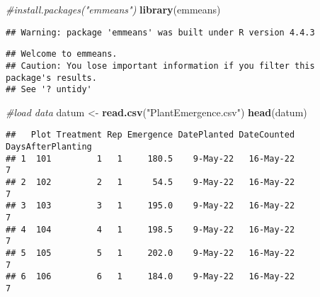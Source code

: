 \documentclass[
]{article}
\newenvironment{Shaded}{\begin{snugshade}}{\end{snugshade}}
\newcommand{\CommentTok}[1]{\textcolor[rgb]{0.56,0.35,0.01}{\textit{#1}}}
\newcommand{\FunctionTok}[1]{\textcolor[rgb]{0.13,0.29,0.53}{\textbf{#1}}}
\newcommand{\NormalTok}[1]{#1}
\newcommand{\OtherTok}[1]{\textcolor[rgb]{0.56,0.35,0.01}{#1}}
\newcommand{\SpecialCharTok}[1]{\textcolor[rgb]{0.81,0.36,0.00}{\textbf{#1}}}
\newcommand{\StringTok}[1]{\textcolor[rgb]{0.31,0.60,0.02}{#1}}
\begin{document}
\begin{Shaded}
\begin{Highlighting}[]
\CommentTok{\#install.packages("emmeans")}
\FunctionTok{library}\NormalTok{(emmeans)}
\end{Highlighting}
\end{Shaded}

\begin{verbatim}
## Warning: package 'emmeans' was built under R version 4.4.3
\end{verbatim}

\begin{verbatim}
## Welcome to emmeans.
## Caution: You lose important information if you filter this package's results.
## See '? untidy'
\end{verbatim}

\begin{Shaded}
\begin{Highlighting}[]
\CommentTok{\#load data}
\NormalTok{datum }\OtherTok{\textless{}{-}} \FunctionTok{read.csv}\NormalTok{(}\StringTok{"PlantEmergence.csv"}\NormalTok{)}
\FunctionTok{head}\NormalTok{(datum)}
\end{Highlighting}
\end{Shaded}

\begin{verbatim}
##   Plot Treatment Rep Emergence DatePlanted DateCounted DaysAfterPlanting
## 1  101         1   1     180.5    9-May-22   16-May-22                 7
## 2  102         2   1      54.5    9-May-22   16-May-22                 7
## 3  103         3   1     195.0    9-May-22   16-May-22                 7
## 4  104         4   1     198.5    9-May-22   16-May-22                 7
## 5  105         5   1     202.0    9-May-22   16-May-22                 7
## 6  106         6   1     184.0    9-May-22   16-May-22                 7
\end{verbatim}

\begin{Shaded}
\end{Shaded}
\end{document}
